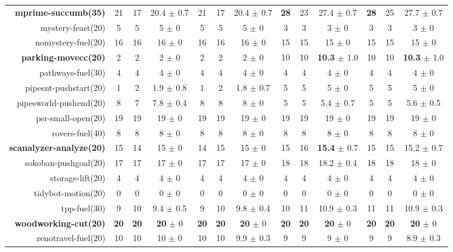 \begin{center}
\begin{tabular}{|r|*{4}{ccc|}}
\textbf{mprime-succumb(35)} & 21 & 17 & 20.4 \(\pm\) 0.7 & 21 & 17 & 20.4 \(\pm\) 0.7 & \textbf{28} & 23 & 27.4 \(\pm\) 0.7 & \textbf{28} & 25 & 27.7 \(\pm\) 0.7\\
mystery-feast(20) & 5 & 5 & 5 \(\pm\) 0 & 5 & 5 & 5 \(\pm\) 0 & 3 & 3 & 3 \(\pm\) 0 & 3 & 3 & 3 \(\pm\) 0\\
nomystery-fuel(20) & 16 & 16 & 16 \(\pm\) 0 & 16 & 16 & 16 \(\pm\) 0 & 15 & 15 & 15 \(\pm\) 0 & 15 & 15 & 15 \(\pm\) 0\\
\textbf{parking-movecc(20)} & 2 & 2 & 2 \(\pm\) 0 & 2 & 2 & 2 \(\pm\) 0 & 10 & 10 & \textbf{10.3} \(\pm\) 1.0 & 10 & 10 & \textbf{10.3} \(\pm\) 1.0\\
pathways-fuel(30) & 4 & 4 & 4 \(\pm\) 0 & 4 & 4 & 4 \(\pm\) 0 & 4 & 4 & 4 \(\pm\) 0 & 4 & 4 & 4 \(\pm\) 0\\
pipesnt-pushstart(20) & 1 & 2 & 1.9 \(\pm\) 0.8 & 1 & 2 & 1.8 \(\pm\) 0.7 & 5 & 5 & 5 \(\pm\) 0 & 5 & 5 & 5 \(\pm\) 0\\
pipesworld-pushend(20) & 8 & 7 & 7.8 \(\pm\) 0.4 & 8 & 8 & 8 \(\pm\) 0 & 5 & 5 & 5.4 \(\pm\) 0.7 & 5 & 5 & 5.6 \(\pm\) 0.5\\
psr-small-open(20) & 19 & 19 & 19 \(\pm\) 0 & 19 & 19 & 19 \(\pm\) 0 & 19 & 19 & 19 \(\pm\) 0 & 19 & 19 & 19 \(\pm\) 0\\
rovers-fuel(40) & 8 & 8 & 8 \(\pm\) 0 & 8 & 8 & 8 \(\pm\) 0 & 8 & 8 & 8 \(\pm\) 0 & 8 & 8 & 8 \(\pm\) 0\\
\textbf{scanalyzer-analyze(20)} & 15 & 14 & 15 \(\pm\) 0 & 14 & 15 & 15 \(\pm\) 0 & 15 & 16 & \textbf{15.4} \(\pm\) 0.7 & 15 & 15 & 15.2 \(\pm\) 0.7\\
sokoban-pushgoal(20) & 17 & 17 & 17 \(\pm\) 0 & 17 & 17 & 17 \(\pm\) 0 & 18 & 18 & 18.2 \(\pm\) 0.4 & 18 & 18 & 18 \(\pm\) 0\\
storage-lift(20) & 4 & 4 & 4 \(\pm\) 0 & 4 & 4 & 4 \(\pm\) 0 & 4 & 4 & 4 \(\pm\) 0 & 4 & 4 & 4 \(\pm\) 0\\
tidybot-motion(20) & 0 & 0 & 0 \(\pm\) 0 & 0 & 0 & 0 \(\pm\) 0 & 0 & 0 & 0 \(\pm\) 0 & 0 & 0 & 0 \(\pm\) 0\\
tpp-fuel(30) & 9 & 10 & 9.4 \(\pm\) 0.5 & 9 & 10 & 9.8 \(\pm\) 0.4 & 10 & 11 & 10.9 \(\pm\) 0.3 & 11 & 11 & 10.9 \(\pm\) 0.3\\
\textbf{woodworking-cut(20)} & \textbf{20} & \textbf{20} & \textbf{20} \(\pm\) 0 & \textbf{20} & \textbf{20} & \textbf{20} \(\pm\) 0 & \textbf{20} & \textbf{20} & \textbf{20} \(\pm\) 0 & \textbf{20} & \textbf{20} & \textbf{20} \(\pm\) 0\\
zenotravel-fuel(20) & 10 & 10 & 10 \(\pm\) 0 & 10 & 10 & 9.9 \(\pm\) 0.3 & 9 & 9 & 9 \(\pm\) 0 & 9 & 9 & 8.9 \(\pm\) 0.3\\
\end{tabular}
\end{center}
